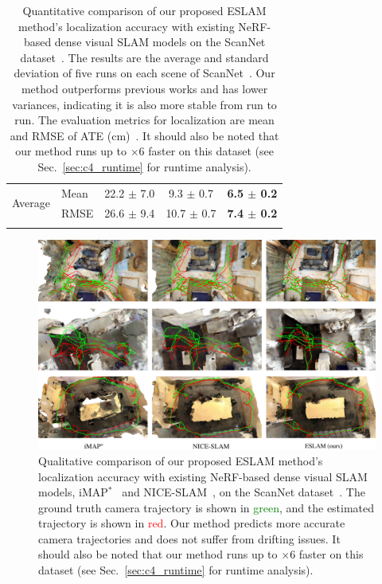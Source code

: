\begin{table}[t]
\begin{center}
\begin{tabular}{ll|ccc}
            \hline
            \multirow{2}{*}{Average} & Mean & 22.2 $\pm$ \phantom{0}7.0 & \phantom{0}9.3 $\pm$ 0.7 & \textbf{6.5 $\pm$ 0.2} \\
            & RMSE & 26.6 $\pm$ \phantom{0}9.4 & 10.7 $\pm$ 0.7 & \textbf{7.4 $\pm$ 0.2} \\

            \Xhline{2\arrayrulewidth}
        \end{tabular}
    \end{center}
    \caption{Quantitative comparison of our proposed ESLAM method's localization accuracy with existing NeRF-based dense visual SLAM models on the ScanNet dataset~\citep{dai2017scannet}. The results are the average and standard deviation of five runs on each scene of ScanNet~\citep{dai2017scannet}. Our method outperforms previous works and has lower variances, indicating it is also more stable from run to run. The evaluation metrics for localization are mean and RMSE of ATE (cm)~\citep{sturm2012benchmark}. It should also be noted that our method runs up to $\times$6 faster on this dataset (see Sec.~\ref{sec:c4_runtime} for runtime analysis).}
    \label{table:quantitative_scannet}
\end{table}

\begin{figure}[t]
    \begin{center}
        \includegraphics[width=1.0\linewidth]{images/chapter4/figures/Fig4.jpg}
    \end{center}
    \caption{Qualitative comparison of our proposed ESLAM method's localization accuracy with existing NeRF-based dense visual SLAM models, iMAP$^*$~\citep{sucar2021imap} and NICE-SLAM~\citep{zhu2022nice}, on the ScanNet dataset~\citep{dai2017scannet}. The ground truth camera trajectory is shown in \textcolor{green}{green}, and the estimated trajectory is shown in \textcolor{red}{red}. Our method predicts more accurate camera trajectories and does not suffer from drifting issues. It should also be noted that our method runs up to $\times$6 faster on this dataset (see Sec.~\ref{sec:c4_runtime} for runtime analysis).}
    \label{fig:c4_qualitative_tracking}
\end{figure}

